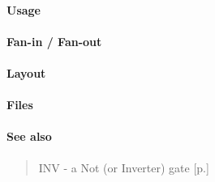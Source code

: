 \paragraph{Usage}

\paragraph{Fan-in / Fan-out}

\paragraph{Layout}

\paragraph{Files}

\paragraph{See also}
\begin{quote}
    INV - a Not (or Inverter) gate [p.\pageref{INV}]
\end{quote}
